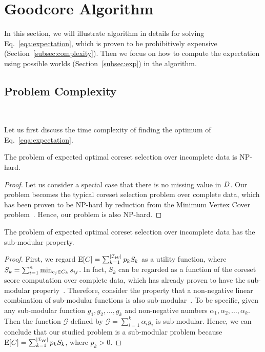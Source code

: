 \section{Goodcore Algorithm}
\label{sec:without}

In this section, we will  illustrate \ours algorithm in details for solving Eq.~\ref{eqa:expectation}, which is proven to be prohibitively expensive (Section~\ref{subsec:complexity}).  Then we focus on how to compute the expectation using possible worlds (Section~\ref{subsec:exp}) in the algorithm.

\subsection{Problem Complexity}~\label{subsec:complexity}

Let us first discuss the time complexity of  finding the optimum of Eq.~\ref{eqa:expectation}. 

\begin{theorem}
	\vspace{-0.3em} 
	The problem of expected optimal coreset selection over incomplete data is NP-hard. 
	\vspace{-0.6em} 
\end{theorem}

\begin{proof}
	Let us consider a special case that there is no missing value in $D$. Our problem becomes the typical coreset selection problem over complete data, which has been proven to be NP-hard by reduction from the Minimum Vertex Cover problem~\cite{dinur2005hardness, mirzasoleiman2020coresets, DBLP:conf/icml/MirzasoleimanBL20}. Hence,  our problem is also NP-hard.
\end{proof}


\begin{theorem}
	\vspace{-0.3em}
	The problem of expected optimal coreset selection over incomplete data has the sub-modular property.
	\vspace{-0.3em}
\end{theorem}

\begin{proof}
	First, we regard $\mathrm{E}[C] = \sum_{k= 1}^{|\mathcal{I_W}|} p_kS_k$ as a utility function, where $S_k = \sum_{i=1}^n \min_{c_j\in C_k}s_{ij}$. In fact, $S_k$ can be regarded as a function of the coreset score computation over complete data, which has already  proven to have the sub-modular property~\cite{mirzasoleiman2020coresets, DBLP:conf/icml/MirzasoleimanBL20, killamsetty2021grad}. Therefore, consider the property that a non-negative linear combination of sub-modular functions is also sub-modular~\cite{lin2011class}. To be specific, given   any sub-modular function $g_1,g_2,\ldots,g_k$ and non-negative numbers $\alpha_1,\alpha_2,\ldots,\alpha_k$. Then the function $\mathcal{G}$ defined by $\mathcal{G}=\sum_{i=1}^k \alpha_i g_i$ is sub-modular.
    Hence, we can conclude that our studied problem is a sub-modular problem because $\mathrm{E}[C] = \sum_{k= 1}^{|\mathcal{I_W}|} p_kS_k$, where $p_k>0$.
    \vspace{-0.3em}
\end{proof}

